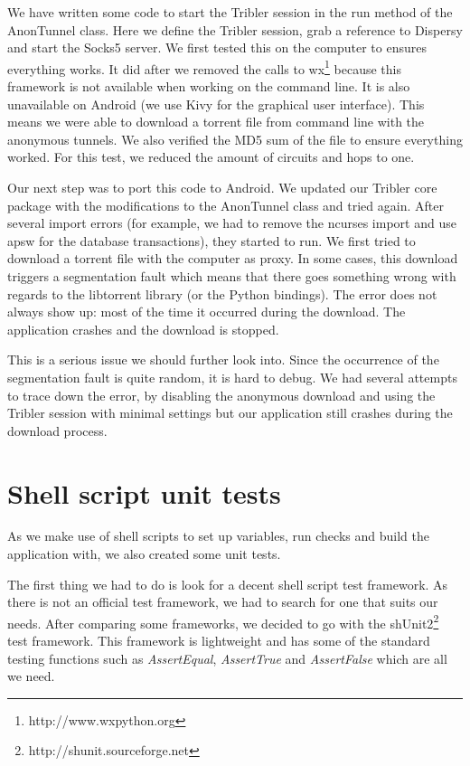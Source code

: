 	We have written some code to start the Tribler session in the run method of the AnonTunnel class. Here we define the Tribler session, grab a reference to Dispersy and start the Socks5 server. We first tested this on the computer to ensures everything works. It did after we removed the calls to wx\footnote{http://www.wxpython.org} because this framework is not available when working on the command line. It is also unavailable on Android (we use Kivy for the graphical user interface). This means we were able to download a torrent file from command line with the anonymous tunnels. We also verified the MD5 sum of the file to ensure everything worked. For this test, we reduced the amount of circuits and hops to one.
	
	Our next step was to port this code to Android. We updated our Tribler core package with the modifications to the AnonTunnel class and tried again. After several import errors (for example, we had to remove the ncurses import and use apsw for the database transactions), they started to run. We first tried to download a torrent file with the computer as proxy. In some cases, this download triggers a segmentation fault which means that there goes something wrong with regards to the libtorrent library (or the Python bindings). The error does not always show up: most of the time it occurred during the download. The application crashes and the download is stopped.
	
	This is a serious issue we should further look into. Since the occurrence of the segmentation fault is quite random, it is hard to debug. We had several attempts to trace down the error, by disabling the anonymous download and using the Tribler session with minimal settings but our application still crashes during the download process.

	\section{Shell script unit tests}
		As we make use of shell scripts to set up variables, run checks and build the application with, we also created some unit tests.
		
		The first thing we had to do is look for a decent shell script test framework. As there is not an official test framework, we had to search for one that suits our needs. After comparing some frameworks, we decided to go with the shUnit2\footnote{http://shunit.sourceforge.net} test framework. This framework is lightweight and has some of the standard testing functions such as \emph{AssertEqual}, \emph{AssertTrue} and \emph{AssertFalse} which are all we need. 
		
